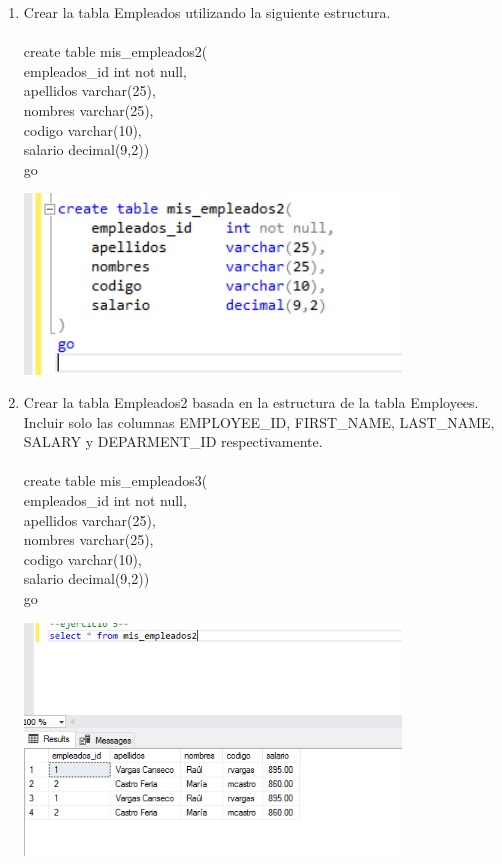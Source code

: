 \begin{enumerate}[1.]
\begin{center}
	\end{center}
	\item Crear la tabla Empleados utilizando la siguiente estructura.
	\\
	\\create table mis\_empleados2(
	\\empleados\_id	int not null,
	\\apellidos		varchar(25),
	\\nombres			varchar(25),
	\\codigo			varchar(10),
	\\salario			decimal(9,2))
	\\go
	\begin{center}
	\includegraphics[width=10cm]{./Imagenes/prac2eje3} 
	\end{center}
	\item Crear la tabla Empleados2 basada en la estructura de la tabla Employees. Incluir solo las columnas EMPLOYEE\_ID, FIRST\_NAME, LAST\_NAME, SALARY y DEPARMENT\_ID 		respectivamente.
	\\
	\\create table mis\_empleados3(
	\\empleados\_id	int not null,
	\\apellidos		varchar(25),
	\\nombres			varchar(25),
	\\codigo			varchar(10),
	\\salario			decimal(9,2))
	\\go
	\begin{center}
	\includegraphics[width=10cm]{./Imagenes/prac2eje5} 

\end{center}
\end{enumerate}
